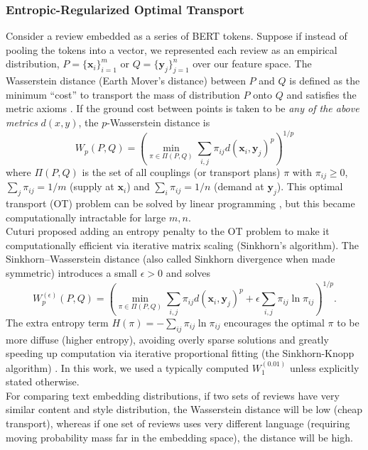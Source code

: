 \documentclass[fleqn,10pt]{SelfArx}
\begin{document}
\subsubsection{Entropic-Regularized Optimal Transport}\label{ws}
Consider a review embedded as a series of BERT tokens. Suppose if instead of pooling the tokens into a vector, we represented each review as an empirical distribution, $P = \{\mathbf{x}_i\}_{i=1}^{m}$ or $Q = \{\mathbf{y}_j\}_{j=1}^{n}$ over our feature space. The Wasserstein distance (Earth Mover’s distance) between $P$ and $Q$ is defined as the minimum “cost” to transport the mass of distribution $P$ onto $Q$ \cite{villani2008optimal} and satisfies the metric axioms \cite{emd}. If the ground cost between points is taken to be \textit{any of the above metrics} $d(x,y)$, the $p$-Wasserstein distance is
$$
W_p(P, Q)=\left(\min _{\pi \in \Pi(P, Q)} \sum_{i, j} \pi_{i j} d\left(\mathbf{x}_i, \mathbf{y}_j\right)^p\right)^{1 / p}
$$
where $\Pi(P,Q)$ is the set of all couplings (or transport plans) $\pi$ with $\pi_{ij}\ge0$, $\sum_j \pi_{ij} = 1/m$ (supply at $\mathbf{x}_i$) and $\sum_i \pi_{ij} = 1/n$ (demand at $\mathbf{y}_j$). This optimal transport (OT) problem can be solved by linear programming \cite{flamary2021pot}, but this became computationally intractable for large $m,n$.\\
Cuturi \cite{cuturi2013sinkhorn} proposed adding an entropy penalty to the OT problem to make it computationally efficient via iterative matrix scaling (Sinkhorn’s algorithm). The Sinkhorn–Wasserstein distance (also called Sinkhorn divergence when made symmetric) introduces a small $\epsilon > 0$ and solves
$$
W_p^{(\epsilon)}(P, Q)=\left(\min _{\pi \in \Pi(P, Q)} \sum_{i, j} \pi_{i j} d\left(\mathbf{x}_i, \mathbf{y}_j\right)^p+\epsilon \sum_{i, j} \pi_{i j} \ln \pi_{i j}\right)^{1 / p} .
$$
The extra entropy term $H(\pi) = -\sum_{ij}\pi_{ij}\ln \pi_{ij}$ encourages the optimal $\pi$ to be more diffuse (higher entropy), avoiding overly sparse solutions and greatly speeding up computation via iterative proportional fitting (the Sinkhorn-Knopp algorithm) \cite{cuturi2013sinkhorn}. In this work, we used a typically computed $W_1^{(0.01)}$ unless explicitly stated otherwise.\\
For comparing text embedding distributions, if two sets of reviews have very similar content and style distribution, the Wasserstein distance will be low (cheap transport), whereas if one set of reviews uses very different language (requiring moving probability mass far in the embedding space), the distance will be high.
\end{document}

